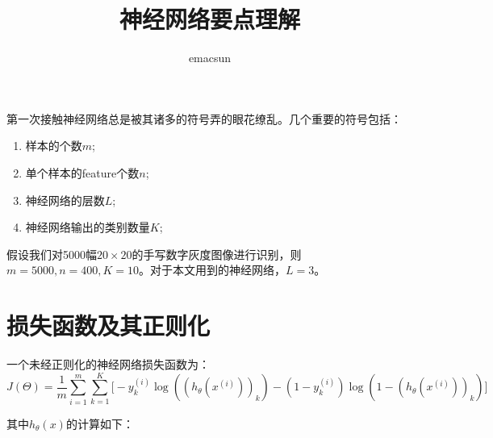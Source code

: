 \documentclass[10pt,a4paper,UTF8]{article}
\author{emacsun}
\date{}
\title{神经网络要点理解}
\begin{document}
\maketitle
\tableofcontents
{}
第一次接触神经网络总是被其诸多的符号弄的眼花缭乱。几个重要的符号包括：

\begin{enumerate}
\item 样本的个数\(m\);
\item 单个样本的feature个数\(n\);
\item 神经网络的层数\(L\);
\item 神经网络输出的类别数量\(K\);
\end{enumerate}

假设我们对5000幅\(20\times 20\)的手写数字灰度图像进行识别，则\(m=5000,n=400,K=10\)。对于本文用到的神经网络，\(L=3\)。

\section{损失函数及其正则化}
\label{sec:org8860247}
一个未经正则化的神经网络损失函数为：
\begin{equation}
\label{eq:1}
J(\Theta) = \frac{1}{m} \sum_{i=1}^{m} \sum_{k=1}^{K} \big[ - y_{k}^{(i)}\log ((h_{\theta}(x^{(i)}))_{k}) - (1-y_{k}^{(i)})\log (1- (h_{\theta}(x^{(i)}))_{k} ) \big]
\end{equation}

其中\(h_{\theta}(x)\)的计算如下：
\end{document}
